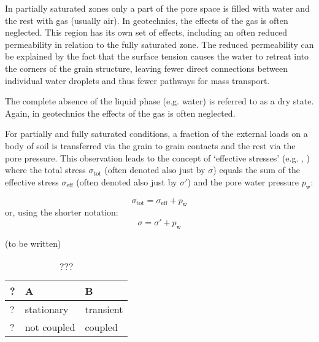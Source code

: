 In partially saturated zones only a part of the pore space is filled with water
and the rest with gas (usually air). In geotechnics, the effects of the gas is
often neglected. This region has its own set of effects, including an often
reduced permeability in relation to the fully saturated zone. The reduced
permeability can be explained by the fact that the surface tension causes the
water to retreat into the corners of the grain structure, leaving fewer direct
connections between individual water droplets and thus fewer pathways for mass
transport.

The complete absence of the liquid phase (e.g. water) is referred to as a dry
state. Again, in geotechnics the effects of the gas is often neglected.

For partially and fully saturated conditions, a fraction of the external loads
on a body of soil is transferred via the grain to grain contacts and the rest
via the pore pressure. This observation leads to the concept of ‘effective
stresses’ (e.g. \cite{doi:10.1680/geot.1962.12.2.125},
\cite{doi:10.1680/sposm.02050.0014}) where the total stress
$\sigma_\mathrm{tot}$ (often denoted also just by $\sigma$) equals the sum of
the effective stress $\sigma_\mathrm{eff}$ (often denoted also just by
$\sigma'$) and the pore water pressure $p_\mathrm{w}$:

\begin{equation}
  \sigma_\mathrm{tot} = \sigma_\mathrm{eff} + p_\mathrm{w}
\end{equation}
or, using the shorter notation:
\begin{equation}
  \sigma = \sigma' + p_\mathrm{w}
\end{equation}

(to be written)

\begin{table}
  \begin{tabularx}{\textwidth}{@{}lYY@{}}
    \hline
    ?
     &
    A
     &
    B
    \\

    \hline
    ?
     &
    stationary
     &
    transient
    \\

    ?
     &
    not coupled
     &
    coupled
    \\

    \hline
  \end{tabularx}
  \caption{???}
  \label{tab:entities-water-simulation-types}
\end{table}
